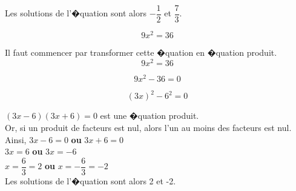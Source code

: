 \documentclass[a4paper,10pt,twoside,french]{article}
\begin{document}
Les solutions de l'�quation sont alors $-\dfrac{1}{2}$ et $ \dfrac{7}{3}$.\\
 
 
\color{black}

 
$$9x^{2} = 36$$

 \color{red}
 
Il faut commencer par transformer cette �quation en �quation produit.\\

$$9x^{2} = 36$$

$$9x^{2} - 36=0$$


$$(3x)^{2} - 6^{2}=0$$

$(3x - 6) (3x + 6)=0$ est une �quation produit.\\

Or, si un produit de facteurs est nul, alors l'un au moins des facteurs est nul.\\

Ainsi, \hspace*{0.6cm} $3x-6 = 0$ \hspace*{1cm} \textbf{ou} \hspace*{1cm}$3x+6 = 0$\\

\hspace*{1.6cm} $3x= 6$ \hspace*{1.5cm} \textbf{ou} \hspace*{1cm}$3x = -6$\\

\hspace*{1.6cm} $x=\dfrac{6}{3}=2$ \hspace*{1.5cm} \textbf{ou} \hspace*{1cm}$x = -\dfrac{6}{3}=-2$\\


Les solutions de l'�quation sont alors 2 et -2.\\

\color{black}
\newpage
\end{document}
